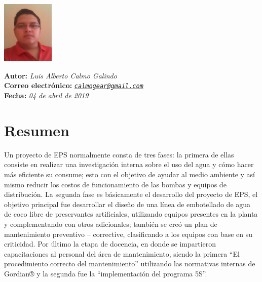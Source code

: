 \documentclass[11pt,spanish,Letterpaper,openany]{book}
\begin{document}
\begin {flushleft}

\begin{tcolorbox}[sharp corners=uphill, colback=fondo, colframe=fondo, arc=6mm, boxrule=0mm, boxsep=2mm,  opacityframe=0.19,  opacityback=0.19]

\begin{minipage}[c]{3cm}

\includegraphics[width=2.5cm,height=\textheight]{images/201901-lcalmo-photo.jpg}

\end{minipage}\begin{minipage}[c]{12cm}

\textbf{Autor:} \emph{Luis Alberto Calmo Galindo}\\
\textbf{Correo electrónico:} \emph{\href{mailto:calmogear@gmail.com}{\nolinkurl{calmogear@gmail.com}}}\\
\textbf{Fecha:} \emph{04 de abril de 2019}

\end{minipage}

\end {tcolorbox}

\end {flushleft}

\hypertarget{resumen-2}{%
\section*{Resumen}\label{resumen-2}}

Un proyecto de EPS normalmente consta de tres fases: la primera de ellas consiste en realizar una investigación interna sobre el uso del agua y cómo hacer más eficiente su consume; esto con el objetivo de ayudar al medio ambiente y así mismo reducir los costos de funcionamiento de las bombas y equipos de distribución. La segunda fase es básicamente el desarrollo del proyecto de EPS, el objetivo principal fue desarrollar el diseño de una línea de embotellado de agua de coco libre de preservantes artificiales, utilizando equipos presentes en la planta y complementando con otros adicionales; también se creó un plan de mantenimiento preventivo -- corrective, clasificando a los equipos con base en su criticidad. Por último la etapa de docencia, en donde se impartieron capacitaciones al personal del área de mantenimiento, siendo la primera ``El procedimiento correcto del mantenimiento'' utilizando las normativas internas de Gordian® y la segunda fue la ``implementación del programa 5S''.
\end{document}
